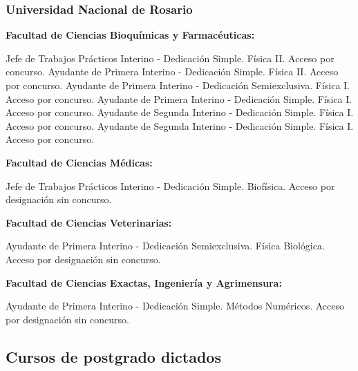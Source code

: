 \subsubsection{Universidad Nacional de Rosario}
  
\textbf{Facultad de Ciencias Bioquímicas y Farmacéuticas:} 

\begin{timeline}
 Jefe de Trabajos Prácticos Interino - Dedicación Simple. Física II. Acceso por concurso.
 Ayudante de Primera Interino - Dedicación Simple. Física II. Acceso por concurso.
 Ayudante de Primera Interino - Dedicación Semiexclusiva. Física I. Acceso por concurso.
 Ayudante de Primera Interino - Dedicación Simple. Física I. Acceso por concurso.
 Ayudante de Segunda Interino - Dedicación Simple. Física I. Acceso por concurso.
 Ayudante de Segunda Interino - Dedicación Simple. Física I. Acceso por concurso.
\end{timeline}

\textbf{Facultad de Ciencias Médicas:}

\begin{timeline}
 Jefe de Trabajos Prácticos Interino - Dedicación Simple. Biofísica. Acceso por designación sin concurso.
\end{timeline}


\textbf{Facultad de Ciencias Veterinarias:}

\begin{timeline}
 Ayudante de Primera Interino - Dedicación Semiexclusiva. Física Biológica. Acceso por designación sin concurso.
\end{timeline}

\textbf{Facultad de Ciencias Exactas, Ingeniería y Agrimensura:}

\begin{timeline}
 Ayudante de Primera Interino - Dedicación Simple. Métodos Numéricos. Acceso por designación sin concurso.
\end{timeline}

\subsection{Cursos de postgrado dictados}


